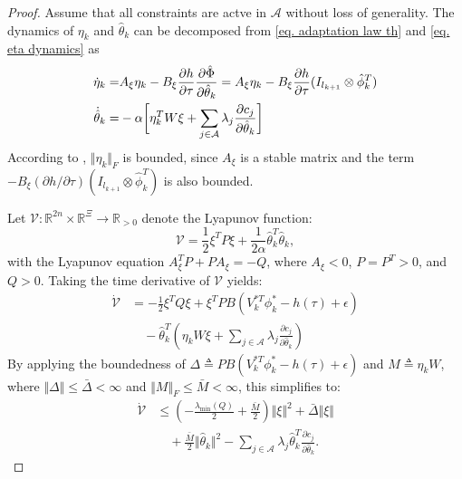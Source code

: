 \documentclass[lettersize,journal]{IEEEtran}
\begin{document}
\begin{proof}
Assume that all constraints are actve in $\mathcal A$ without loss of generality. The dynamics of $\eta_k$ and $\hat\theta_k$ can be decomposed from \eqref{eq. adaptation law th} and \eqref{eq. eta dynamics} as 
\begin{equation}
    \begin{aligned}
        \dot\eta_k =
        & 
        A_\xi \eta_k -B_\xi {\partial h\over\partial\tau}{\partial \hat\Phi\over \partial \hat\theta_k}
        =
        A_\xi \eta_k -B_\xi {\partial h\over\partial\tau}(I_{l_{k+1}}\otimes \hat\phi_k^T)\\
        \dot{\hat\theta}_k =
        & -\alpha 
        \bigg[
            \eta_k^TW\xi+
            \sum_{j\in\mathcal{A}}
            \lambda_j{\partial c_j\over\partial \hat\theta_k}
        \bigg]
    \end{aligned} 
\end{equation}
According to \cite[Chap.~4 T.~1.9]{RN13}, $\Vert \eta_k\Vert_F$ is bounded, since $A_\xi$ is a stable matrix and the term $-B_\xi(\partial h/\partial \tau)(I_{l_{k+1}}\otimes\hat\phi_k^T)$ is also bounded.

Let $\mathcal{V}: \mathbb{R}^{2n} \times \mathbb{R}^{\Xi} \to \mathbb{R}_{>0}$ denote the Lyapunov function:
\begin{equation}
    \mathcal{V} = \frac{1}{2} \xi^T P \xi + \frac{1}{2 \alpha} \hat{\theta}_k^T \hat{\theta}_k,
    \label{eq. Lyapunov func}
\end{equation}
with the Lyapunov equation $A_\xi^T P + P A_\xi = -Q$, where $A_\xi < 0$, $P = P^T > 0$, and $Q > 0$.
Taking the time derivative of $\mathcal{V}$ yields:
\begin{equation}
    \begin{aligned}
        \dot{\mathcal{V}} 
        &= -\frac{1}{2} \xi^T Q \xi + \xi^T P B (V_k^{*T} \phi_k^* - h(\tau) + \epsilon) \\
        &\quad - \hat{\theta}_k^T \left( \eta_k W \xi + \sum_{j \in \mathcal{A}} \lambda_j \frac{\partial c_j}{\partial \hat{\theta}_k} \right)
    \end{aligned}
    \label{eq. Lyapunov dot}
\end{equation}
By applying the boundedness of $\Delta \triangleq P B (V_k^{*T} \phi_k^* - h(\tau) + \epsilon)$ and $M \triangleq \eta_k W$, where $\Vert \Delta \Vert \leq \bar{\Delta} < \infty$ and $\Vert M \Vert_F \leq \bar{M} < \infty$, this simplifies to:
\begin{equation}
    \begin{aligned}
        \dot{\mathcal{V}} 
        &\leq \left( -\frac{\lambda_{\text{min}}(Q)}{2} + \frac{\bar{M}}{2} \right) \Vert \xi \Vert^2 + \bar{\Delta} \Vert \xi \Vert \\
        &\quad + \frac{\bar{M}}{2} \Vert \hat{\theta}_k \Vert^2 - \sum_{j \in \mathcal{A}} \lambda_j \hat{\theta}_k^T \frac{\partial c_j}{\partial \hat{\theta}_k}.
    \end{aligned}
    \label{eq. dot Vk 1}
\end{equation}


\end{proof}
\end{document}
